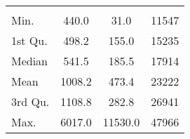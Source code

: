 \begin{tabular}{lS[table-format=5.1]S[table-format=5.1]S[table-format=5.1]}
&  &  &  \\
 Min.    & 440.0 & 31.0 & 11547 \\
 1st Qu. & 498.2 & 155.0 & 15235 \\
 Median  & 541.5 & 185.5 & 17914 \\
 Mean    & 1008.2 & 473.4 & 23222 \\
 3rd Qu. & 1108.8 & 282.8 & 26941 \\
 Max.    & 6017.0 & 11530.0 & 47966 \\
\end{tabular}
